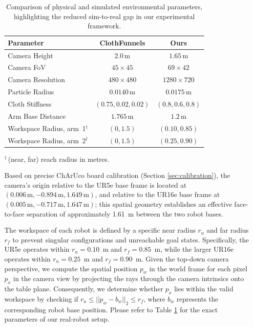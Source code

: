 \documentclass[journal]{IEEEtran}
\begin{document}
\begin{table}[!t]
\caption{Comparison of physical and simulated environmental parameters, highlighting the reduced sim-to-real gap in our experimental framework.}
\label{tab:sim-real-params}
\centering
\footnotesize
\setlength{\tabcolsep}{4pt}
\begin{tabular}{l|cc}
\toprule
\textbf{Parameter} & \textbf{ClothFunnels} & \textbf{Ours} \\
\midrule
Camera Height & $2.0\,\mathrm{m}$ & $1.65\,\mathrm{m}$ \\
Camera FoV  & $45{\times}45$ & $69{\times}42$ \\
Camera Resolution  & $480{\times}480$ & $1280{\times}720$ \\
Particle Radius & $0.0140\,\mathrm{m}$ & $0.0175\,\mathrm{m}$ \\
Cloth Stiffness & $(0.75, 0.02, 0.02)$ & $(0.8, 0.6, 0.8)$ \\
Arm Base Distance & $1.765\,\mathrm{m}$ & $1.2\,\mathrm{m}$ \\
Workspace Radius, arm~1$^{\dagger}$ & $(0, 1.5)$ & $(0.10, 0.85)$ \\
Workspace Radius, arm~2$^{\dagger}$ & $(0, 1.5)$ & $(0.25, 0.90)$ \\
\bottomrule
\end{tabular}

{\footnotesize $^{\dagger}$\,(near, far) reach radius in metres.}
\end{table}

Based on precise ChArUco board calibration (Section \ref{sec:calibration}), the camera's origin relative to the UR5e base frame is located at $(0.006\,\mathrm{m}, -0.894\,\mathrm{m}, 1.649\,\mathrm{m})$, and relative to the UR16e base frame at $(0.005\,\mathrm{m}, -0.717\,\mathrm{m}, 1.647\,\mathrm{m})$; this spatial geometry establishes an effective face-to-face separation of approximately 1.61~m between the two robot bases.

The workspace of each robot is defined by a specific near radius $r_{n}$ and far radius $r_{f}$ to prevent singular configurations and unreachable goal states. Specifically, the UR5e operates within $r_n = 0.10$~m and $r_f = 0.85$~m, while the larger UR16e operates within $r_n = 0.25$~m and $r_f = 0.90$~m. Given the top-down camera perspective, we compute the spatial position $p_w$ in the world frame for each pixel $p_x$ in the camera view by projecting the rays through the camera intrinsics onto the table plane. Consequently, we determine whether $p_x$ lies within the valid workspace by checking if $r_n \leq ||p_w - b_w||_2 \leq r_f$, where $b_w$ represents the corresponding robot base position. Please refer to Table \ref{tab:sim-real-params} for the exact parameters of our real-robot setup.
\end{document}
